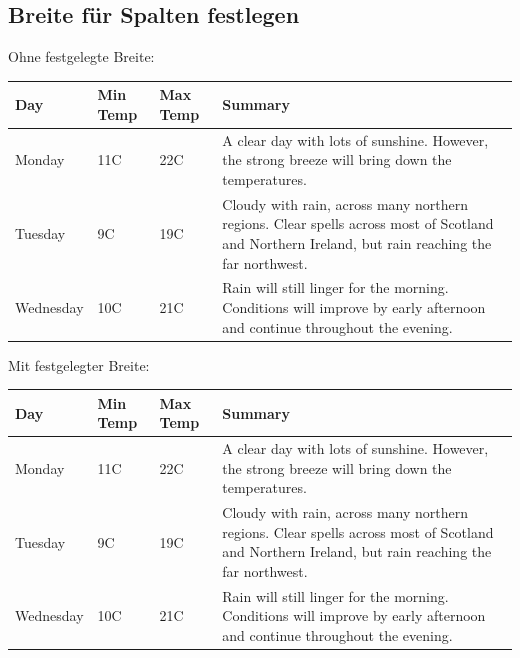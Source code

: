 \newpage
\subsection{Breite für Spalten festlegen}

Ohne festgelegte Breite:
\begin{center}
    \begin{tabular}{| l | l | l | l |}
        \hline
        Day       & Min Temp & Max Temp & Summary                                                      \\ \hline
        Monday    & 11C      & 22C      & A clear day with lots of sunshine.
        However, the strong breeze will bring down the temperatures.                                   \\ \hline
        Tuesday   & 9C       & 19C      & Cloudy with rain, across many northern regions. Clear spells
        across most of Scotland and Northern Ireland,
        but rain reaching the far northwest.                                                           \\ \hline
        Wednesday & 10C      & 21C      & Rain will still linger for the morning.
        Conditions will improve by early afternoon and continue
        throughout the evening.                                                                        \\
        \hline
    \end{tabular}
\end{center}

Mit festgelegter Breite:
\begin{center}
    \begin{tabular}{ | l | l | l | p{5cm} |}
        \hline
        Day       & Min Temp & Max Temp & Summary                                                      \\ \hline
        Monday    & 11C      & 22C      & A clear day with lots of sunshine.
        However, the strong breeze will bring down the temperatures.                                   \\ \hline
        Tuesday   & 9C       & 19C      & Cloudy with rain, across many northern regions. Clear spells
        across most of Scotland and Northern Ireland,
        but rain reaching the far northwest.                                                           \\ \hline
        Wednesday & 10C      & 21C      & Rain will still linger for the morning.
        Conditions will improve by early afternoon and continue
        throughout the evening.                                                                        \\
        \hline
    \end{tabular}
\end{center}

